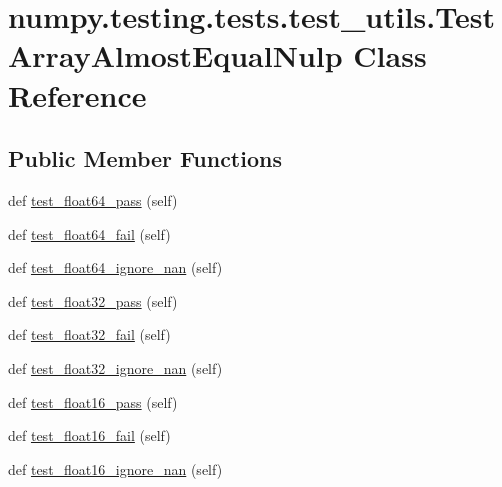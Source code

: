 \hypertarget{classnumpy_1_1testing_1_1tests_1_1test__utils_1_1TestArrayAlmostEqualNulp}{}\section{numpy.\+testing.\+tests.\+test\+\_\+utils.\+Test\+Array\+Almost\+Equal\+Nulp Class Reference}
\label{classnumpy_1_1testing_1_1tests_1_1test__utils_1_1TestArrayAlmostEqualNulp}
\subsection*{Public Member Functions}
\begin{DoxyCompactItemize}
\item 
def \hyperlink{classnumpy_1_1testing_1_1tests_1_1test__utils_1_1TestArrayAlmostEqualNulp_a08641f0c857b759746d1694ade26a259}{test\+\_\+float64\+\_\+pass} (self)
\item 
def \hyperlink{classnumpy_1_1testing_1_1tests_1_1test__utils_1_1TestArrayAlmostEqualNulp_a70cb79913cc7f40babc9027270d6656d}{test\+\_\+float64\+\_\+fail} (self)
\item 
def \hyperlink{classnumpy_1_1testing_1_1tests_1_1test__utils_1_1TestArrayAlmostEqualNulp_a6ab69ba0f5beca9fd5d1b9bed500b69b}{test\+\_\+float64\+\_\+ignore\+\_\+nan} (self)
\item 
def \hyperlink{classnumpy_1_1testing_1_1tests_1_1test__utils_1_1TestArrayAlmostEqualNulp_a97b16f839f71eb55ff205ae8757b361a}{test\+\_\+float32\+\_\+pass} (self)
\item 
def \hyperlink{classnumpy_1_1testing_1_1tests_1_1test__utils_1_1TestArrayAlmostEqualNulp_afac62276a03fe669bafd30d25375725b}{test\+\_\+float32\+\_\+fail} (self)
\item 
def \hyperlink{classnumpy_1_1testing_1_1tests_1_1test__utils_1_1TestArrayAlmostEqualNulp_abe9cf01477ccf2dea0a9e6a96466285d}{test\+\_\+float32\+\_\+ignore\+\_\+nan} (self)
\item 
def \hyperlink{classnumpy_1_1testing_1_1tests_1_1test__utils_1_1TestArrayAlmostEqualNulp_a1202f06ace353a79bf08da579f670ca8}{test\+\_\+float16\+\_\+pass} (self)
\item 
def \hyperlink{classnumpy_1_1testing_1_1tests_1_1test__utils_1_1TestArrayAlmostEqualNulp_a2116f3af932a80013e79e539d9a54ed3}{test\+\_\+float16\+\_\+fail} (self)
\item 
def \hyperlink{classnumpy_1_1testing_1_1tests_1_1test__utils_1_1TestArrayAlmostEqualNulp_a462933b04ca0fea2b1fe537d6d0bdb17}{test\+\_\+float16\+\_\+ignore\+\_\+nan} (self)

\end{DoxyCompactItemize}
